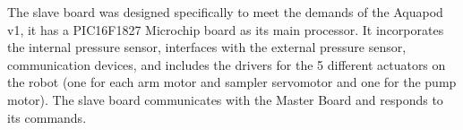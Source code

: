 


The slave board was designed specifically to meet the demands of the Aquapod v1, it has a PIC16F1827 Microchip board as its main processor. It incorporates the internal pressure sensor, interfaces with the external pressure sensor, communication devices, and includes the drivers for the 5 different actuators on the robot (one for each arm motor and sampler servomotor and one for the pump motor). The slave board communicates with the Master Board and responds to its commands.   


